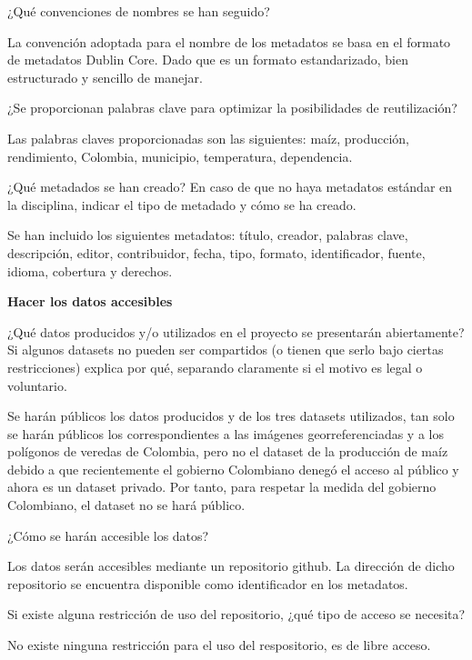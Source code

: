 \documentclass[12pt, spanish]{article}
\begin{document}
\begin{shaded}
¿Qué convenciones de nombres se han seguido?
\end{shaded}

La convención adoptada para el nombre de los metadatos se basa en el formato de metadatos Dublin Core. Dado que es un formato estandarizado, bien estructurado y sencillo de manejar.
\begin{shaded}
¿Se proporcionan palabras clave para optimizar la posibilidades de reutilización?
\end{shaded}
Las palabras claves proporcionadas son las siguientes: maíz, producción, rendimiento, Colombia, municipio, temperatura, dependencia.

\begin{shaded}
¿Qué metadados se han creado? En caso de que no haya metadatos estándar en la disciplina, indicar el tipo de metadado y cómo se ha creado.
\end{shaded}
Se han incluido los siguientes metadatos: título, creador, palabras clave, descripción, editor, contribuidor, fecha, tipo, formato, identificador, fuente, idioma, cobertura y derechos.


\textbf{Hacer los datos accesibles}

\begin{shaded}
¿Qué datos producidos y/o utilizados en el proyecto se presentarán abiertamente? Si algunos datasets no pueden ser compartidos (o tienen que serlo bajo ciertas restricciones) explica por qué, separando claramente si el motivo es legal o voluntario. 
\end{shaded}
Se harán públicos los datos producidos y de los tres datasets utilizados, tan solo se harán públicos los correspondientes a las imágenes georreferenciadas y a los polígonos de veredas de Colombia, pero no el dataset de la producción de maíz debido a que recientemente el gobierno Colombiano denegó el acceso al público y ahora es un dataset privado. Por tanto, para respetar la medida del gobierno Colombiano, el dataset no se hará público.\\

\begin{shaded}
¿Cómo se harán accesible los datos?
\end{shaded}
Los datos serán accesibles mediante un repositorio github. La dirección de dicho repositorio se encuentra disponible como identificador en los metadatos.\\

\begin{shaded}
Si existe alguna restricción de uso del repositorio, ¿qué tipo de acceso se necesita? 
\end{shaded}
No existe ninguna restricción para el uso del respositorio, es de libre acceso.\\
\end{document}
